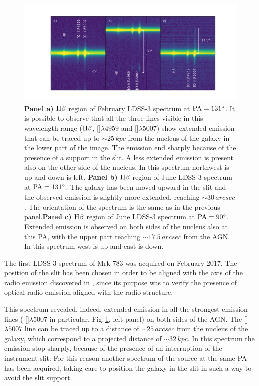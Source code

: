 \documentclass[../main.tex]{subfiles}
\begin{document}
\begin{figure}
\centering
\includegraphics[width=1.1\textwidth]{images/paper3/spectra.jpg} 
\caption[]{\textbf{Panel a)} $\rm H\beta$ region of February LDSS-3 spectrum at $\rm PA=\ang{131}$. It is possible to observe that all the three lines visible in this wavelength range ($\rm H\beta$, []$\lambda4959$ and []$\lambda5007$) show extended emission that can be traced up to $\sim 25\,\si{kpc}$ from the nucleus of the galaxy in the lower part of the image. The emission end sharply because of the presence of a support in the slit. A less extended emission is present also on the other side of the nucleus. In this spectrum northwest is up and down is left. \textbf{Panel b)}  $\rm H\beta$ region of June LDSS-3 spectrum at $\rm PA=\ang{131}$. The galaxy has been moved upward in the slit and the observed emission is slightly more extended, reaching $\sim 30\,\si{arcsec}$. The orientation of the spectrum is the same as in the previous panel.\textbf{Panel c)} $\rm H\beta$ region of June LDSS-3 spectrum at $\rm PA=\ang{90}$. Extended emission is observed on both sides of the nucleus also at this PA, with the upper part reaching $\sim 17.5\,\si{arcsec}$ from the AGN. In this spectrum west is up and east is down.}
\label{fig:three_spectra}
\end{figure}


The first LDSS-3 spectrum of Mrk 783 was acquired on February 2017. 
The position of the slit has been chosen in order to be aligned with the axis of the radio emission discovered in \citep{Congiu17}, since its purpose was to verify the presence of optical radio emission aligned with the radio structure.

This spectrum revealed, indeed, extended emission in all the strongest emission lines ( []$\lambda5007$ in particular, Fig.\,\ref{fig:three_spectra}, left panel) on both sides of the AGN.
The []$\lambda5007$ line can be traced up to a distance of $\sim 25\,\si{arcsec}$ from the nucleus of the galaxy, which correspond to a projected distance of $\sim 32\,\si{kpc}$.
In this spectrum the emission stop sharply, because of the presence of an interruption of the instrument slit.
For this reason another spectrum of the source at the same PA has been acquired, taking care to position the galaxy in the slit in such a way to avoid the slit support.
\end{document}
